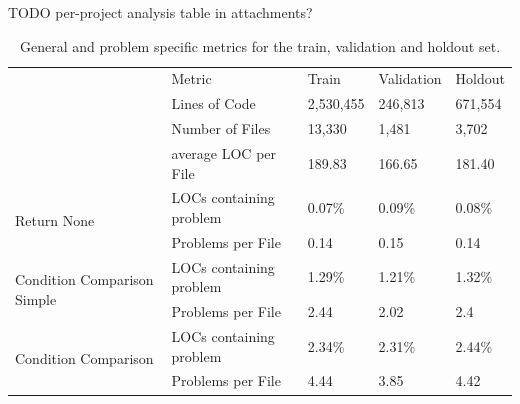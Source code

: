 TODO per-project analysis table in attachments?

\begin{table}[]
    \tabcolsep=0.11cm
    \begin{tabularx}{\textwidth}{@{}llXXX@{}}
        \toprule
    \multirow{4}{*}{}                            & Metric                  & Train & Validation & Holdout \\ \cmidrule(l){2-5} 
                                                 & Lines of Code           & 2,530,455 & 246,813 & 671,554 \\
                                                 & Number of Files         & 13,330  &  1,481 & 3,702   \\
                                                 & average LOC per File    & 189.83  & 166.65  & 181.40     \\ \midrule
    \multirow{2}{*}{Return None}                 & LOCs containing problem & 0.07\%  &  0.09\% & 0.08\%  \\
                                                 & Problems per File       & 0.14    & 0.15  & 0.14    \\ \midrule
    \multirow{2}{*}{Condition Comparison Simple} & LOCs containing problem & 1.29\%  &  1.21\%  & 1.32\%  \\
                                                 & Problems per File       & 2.44    & 2.02 & 2.4    \\ \midrule
    \multirow{2}{*}{Condition Comparison}        & LOCs containing problem & 2.34\%  & 2.31\%  & 2.44\%  \\
                                                 & Problems per File       & 4.44    & 3.85  & 4.42    \\ \bottomrule
    \end{tabularx}
    \caption{General and problem specific metrics for the train, validation and holdout set.}
    \label{tab:general_data_distribution}
\end{table}

